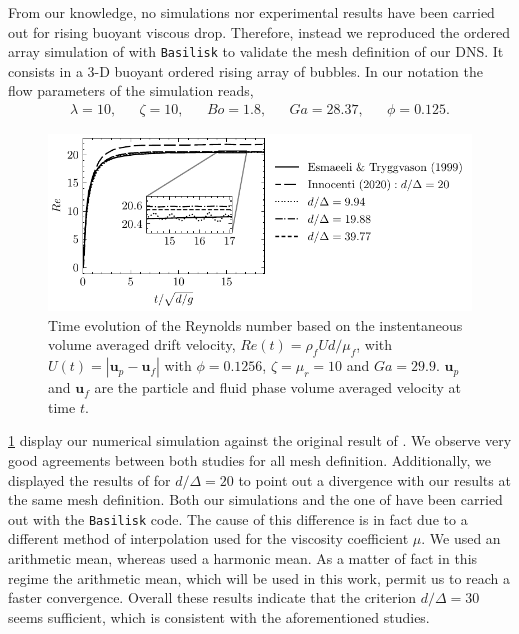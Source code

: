 From our knowledge, no simulations nor experimental results have been carried out for rising buoyant viscous drop. 
Therefore, instead we reproduced the ordered array simulation of \citet{esmaeeli1999direct} with \texttt{Basilisk} to validate the mesh definition of our DNS.  
It consists in a 3-D buoyant ordered rising array of bubbles. 
In our notation the flow parameters of the simulation reads, 
\begin{align*}
    \lambda = 10,
    && \zeta = 10,
    && Bo = 1.8,
    && Ga = 28.37,
    && \phi = 0.125.
\end{align*}
\begin{figure}[h!]
    \centering
    \includegraphics[height = 0.3\textwidth]{image/VALIDATION2.0/Loisy/Re.pdf}
    \caption{Time evolution of the Reynolds number based on the instentaneous volume averaged drift velocity, $Re(t) = \rho_fU d /\mu_f$, with $U(t) = |\textbf{u}_p - \textbf{u}_f|$ with $\phi = 0.1256$, $\zeta =\mu_r =10$ and $Ga = 29.9$.
    $\textbf{u}_p$ and $\textbf{u}_f$ are the particle and fluid phase volume averaged velocity at time $t$.}
    \label{fig:ordered_array}
\end{figure}
\ref{fig:ordered_array} display our numerical simulation against the original result of \citet{esmaeeli1999direct}.
We observe very good agreements between both studies for all mesh definition.
Additionally, we displayed the results of \citet{innocenti2020direct} for $d/\Delta = 20$ to point out a divergence with our results at the same mesh definition.  
Both our simulations and the one of \citet{innocenti2020direct} have been carried out with the  \texttt{Basilisk} code. 
The cause of this difference is in fact due to a different method of interpolation used for the viscosity coefficient $\mu$. 
We used an arithmetic mean, whereas \citet{innocenti2020direct} used a 
harmonic mean.
As a matter of fact in this regime the arithmetic mean, which will be used in this work, permit us to reach a faster convergence. 
Overall these results indicate that the criterion $d/\Delta = 30$ seems sufficient, which is consistent with the aforementioned studies.


